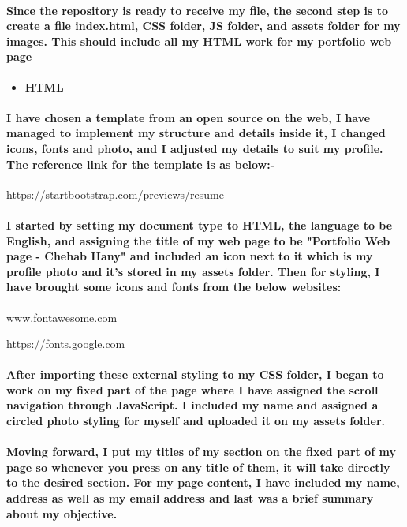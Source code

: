 \documentclass[12pt, letterpaper]{template}
\begin{document}
\paragraph{\Large Since the repository is ready to receive my file, the second step is to create a file index.html, CSS folder, JS folder, and assets folder for my images. This should include all my HTML work for my portfolio web page}

\begin{itemize}
\item \Large \textbf{HTML}
\end{itemize}

\paragraph{\Large I have chosen a template from an open source on the web, I have managed to implement my structure and details inside it, I changed icons, fonts and photo, and I adjusted my details to suit my profile. The reference link for the template is as below:-}
\begin{center}
    \Large\url{https://startbootstrap.com/previews/resume}
\end{center}
\paragraph{\Large I started by setting my document type to HTML, the language to be English, and assigning the title of my web page to be "Portfolio Web page - Chehab Hany" and included an icon next to it which is my profile photo and it's stored in my assets folder. Then for styling, I have brought some icons and fonts from the below websites:}
\begin{center}
    \Large\url{www.fontawesome.com}
\end{center}

\begin{center}
    \Large\url{https://fonts.google.com}
\end{center}
\paragraph{\Large After importing these external styling to my CSS folder, I began to work on my fixed part of the page where I have assigned the scroll navigation through JavaScript. I included my name and assigned a circled photo styling for myself and uploaded it on my assets folder.}

\paragraph{\Large Moving forward, I put my titles of my section on the fixed part of my page so whenever you press on any title of them, it will take directly to the desired section. For my page content, I have included my name, address as well as my email address and last was a brief summary about my objective.}
\end{document}
